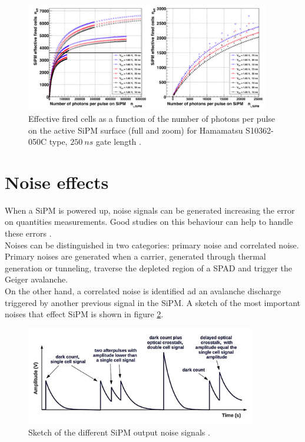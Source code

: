 \begin{figure}
	\centering
	\includegraphics[width=0.95\textwidth]{IMG/Cap3/occupancy.png}
	\caption{Effective fired cells as a function of the number of photons per pulse on the active SiPM surface (full and zoom) for Hamamatsu S10362-050C type, $250\ ns$ gate length \cite{occupancy}.}
	\label{fig:occupancy}
\end{figure}

\section{Noise effects}\label{subsec:noise}
When a SiPM is powered up, noise signals can be generated increasing the error on quantities measurements. Good studies on this behaviour can help to handle these errors \cite{electrics}.\\
Noises can be distinguished in two categories: primary noise and correlated noise. Primary noises are generated when a carrier, generated through thermal generation or tunneling, traverse the depleted region of a SPAD and trigger the Geiger avalanche.\\
On the other hand, a correlated noise is identified ad an avalanche discharge triggered by another previous signal in the SiPM.
A sketch of the most important noises that effect SiPM is shown in figure \ref{fig:sipm_noises}.

\begin{figure}
	\centering
	\includegraphics[width=0.9\textwidth]{IMG/Cap3/sipm_noises.png}
	\caption{Sketch of the different SiPM output noise signals \cite{APD_new_ph}.}
	\label{fig:sipm_noises}
\end{figure}

